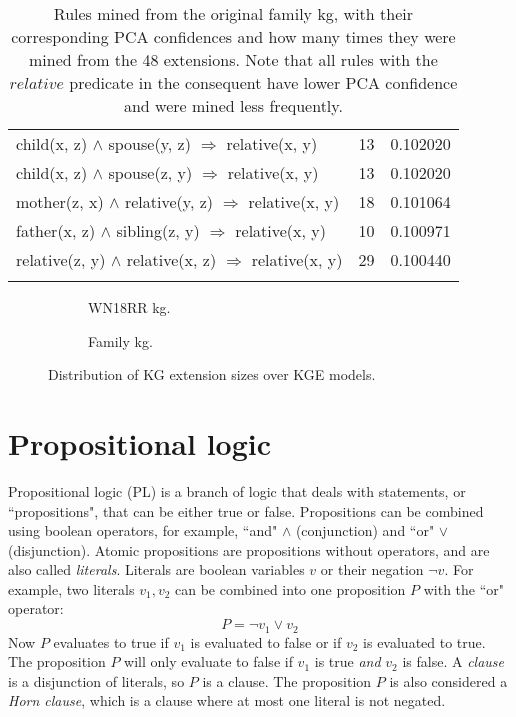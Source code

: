 \begin{longtable}{lrr}
     child(x, z) $\wedge$ spouse(y, z)   $\Rightarrow$ relative(x, y) &           13 &        0.102020 \\
     child(x, z) $\wedge$ spouse(z, y)   $\Rightarrow$ relative(x, y) &           13 &        0.102020 \\
  mother(z, x) $\wedge$ relative(y, z)   $\Rightarrow$ relative(x, y) &           18 &        0.101064 \\
   father(x, z) $\wedge$ sibling(z, y)   $\Rightarrow$ relative(x, y) &           10 &        0.100971 \\
relative(z, y) $\wedge$ relative(x, z)   $\Rightarrow$ relative(x, y) &           29 &        0.100440 \\
\bottomrule
\caption[Rules mined from the original family KG]{Rules mined from the original family \gls{kg}, with their corresponding PCA confidences and how many times they were mined from the 48 extensions. Note that all rules with the $relative$ predicate in the consequent have lower PCA confidence and were mined less frequently.}
\label{family_original_rules_table_PCA}
\end{longtable}


\begin{figure}[htb]
\centering
\begin{subfigure}{.5\textwidth}
  \centering
  
  \caption{WN18RR \gls{kg}.}
  \label{fig:model_extension_wn18rr_boxplot_sub}
\end{subfigure}%
\begin{subfigure}{.5\textwidth}
  \centering
  
  \caption{Family \gls{kg}.}
  \label{fig:model_extension_family_boxplot_sub}
\end{subfigure}
\caption{Distribution of KG extension sizes over KGE models.}
\label{model_extensions_boxplot}
\end{figure}

\chapter{Propositional logic}
\label{propositional_logic}
Propositional logic (PL) is a branch of logic that deals with statements, or ``propositions", that can be either true or false. Propositions can be combined using boolean operators, for example, ``and" $\wedge$ (conjunction) and ``or" $\vee$ (disjunction). Atomic propositions are propositions without operators, and are also called \textit{literals}. Literals are boolean variables $v$ or their negation $\neg v$. For example, two literals $v_1, v_2$ can be combined into one proposition $P$ with the ``or" operator:
\[P = \neg v_1 \vee v_2\]
Now $P$ evaluates to true if $v_1$ is evaluated to false or if $v_2$ is evaluated to true. The proposition $P$ will only evaluate to false if $v_1$ is true \textit{and} $v_2$ is false. A \textit{clause} is a disjunction of literals, so $P$ is a clause. The proposition $P$ is also considered a \textit{Horn clause}, which is a clause where at most one literal is not negated. 

